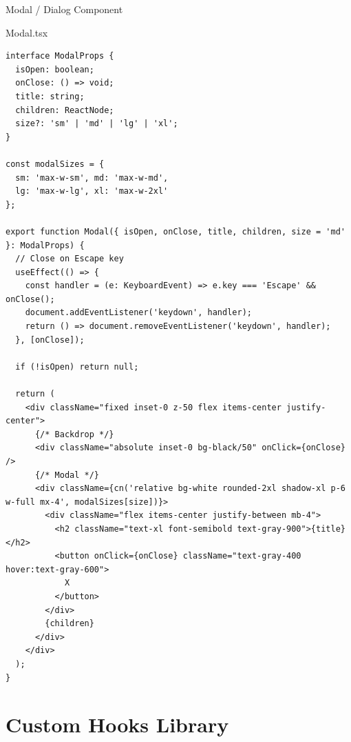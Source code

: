 \documentclass[12pt,a4paper]{article}
\begin{document}
\vspace{0.5cm}

\begin{compbox}{Modal / Dialog Component}
\begin{codebox}{Modal.tsx}
\begin{lstlisting}
interface ModalProps {
  isOpen: boolean;
  onClose: () => void;
  title: string;
  children: ReactNode;
  size?: 'sm' | 'md' | 'lg' | 'xl';
}

const modalSizes = {
  sm: 'max-w-sm', md: 'max-w-md',
  lg: 'max-w-lg', xl: 'max-w-2xl'
};

export function Modal({ isOpen, onClose, title, children, size = 'md' }: ModalProps) {
  // Close on Escape key
  useEffect(() => {
    const handler = (e: KeyboardEvent) => e.key === 'Escape' && onClose();
    document.addEventListener('keydown', handler);
    return () => document.removeEventListener('keydown', handler);
  }, [onClose]);

  if (!isOpen) return null;

  return (
    <div className="fixed inset-0 z-50 flex items-center justify-center">
      {/* Backdrop */}
      <div className="absolute inset-0 bg-black/50" onClick={onClose} />
      {/* Modal */}
      <div className={cn('relative bg-white rounded-2xl shadow-xl p-6 w-full mx-4', modalSizes[size])}>
        <div className="flex items-center justify-between mb-4">
          <h2 className="text-xl font-semibold text-gray-900">{title}</h2>
          <button onClick={onClose} className="text-gray-400 hover:text-gray-600">
            X
          </button>
        </div>
        {children}
      </div>
    </div>
  );
}
\end{lstlisting}
\end{codebox}
\end{compbox}

\newpage

\section{Custom Hooks Library}
\end{document}

